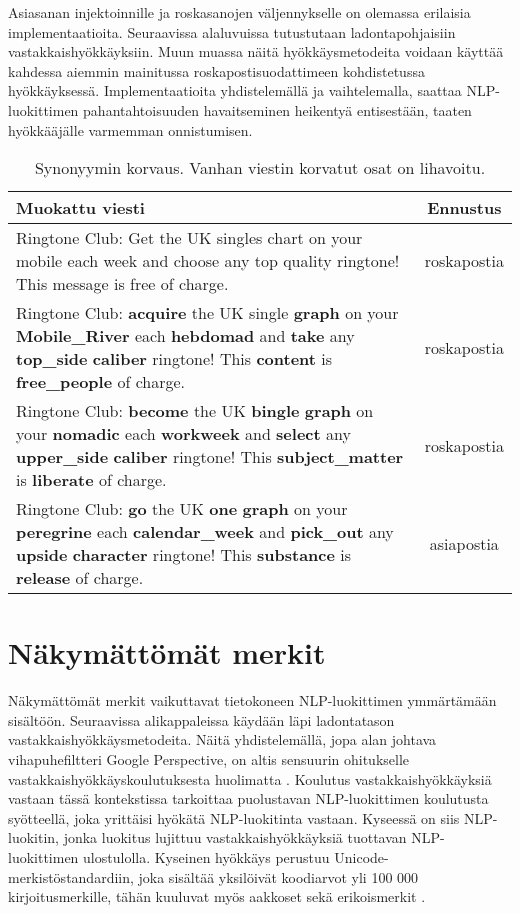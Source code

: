 Asiasanan injektoinnille ja roskasanojen väljennykselle on olemassa erilaisia implementaatioita. Seuraavissa alaluvuissa tutustutaan ladontapohjaisiin vastakkaishyökkäyksiin. Muun muassa näitä hyökkäysmetodeita voidaan käyttää kahdessa aiemmin mainitussa roskapostisuodattimeen kohdistetussa hyökkäyksessä. Implementaatioita yhdistelemällä ja vaihtelemalla, saattaa NLP-luokittimen pahantahtoisuuden havaitseminen heikentyä entisestään, taaten hyökkääjälle varmemman onnistumisen.

\begin{table}[t]
  \begin{tabularx}{\textwidth}{| >{\raggedright\arraybackslash}X | c |}
    \hline
    Muokattu viesti & Ennustus\\
    \hline
    Ringtone Club: Get the UK singles chart on your mobile each week and choose any top quality ringtone! This message is free of charge. & roskapostia\\
    \hline
    Ringtone Club: \textbf{acquire} the UK single \textbf{graph} on your \textbf{Mobile\_River} each \textbf{hebdomad} and \textbf{take} any \textbf{top\_side} \textbf{caliber} ringtone! This \textbf{content} is \textbf{free\_people} of charge. & roskapostia\\
    \hline
    Ringtone Club: \textbf{become} the UK \textbf{bingle} \textbf{graph} on your \textbf{nomadic} each \textbf{workweek} and \textbf{select} any \textbf{upper\_side} \textbf{caliber} ringtone! This \textbf{subject\_matter} is \textbf{liberate} of charge. & roskapostia \\
    \hline
    Ringtone Club: \textbf{go} the UK \textbf{one} \textbf{graph} on your \textbf{peregrine} each \textbf{calendar\_week} and \textbf{pick\_out} any \textbf{upside} \textbf{character} ringtone! This \textbf{substance} is \textbf{release} of charge. & asiapostia \\
    \hline
  \end{tabularx}
  \caption{Synonyymin korvaus. Vanhan viestin korvatut osat on lihavoitu. \citep{spamfilter}}
\end{table}

\section{Näkymättömät merkit}
Näkymättömät merkit vaikuttavat tietokoneen NLP-luokittimen ymmärtämään sisältöön. Seuraavissa alikappaleissa käydään läpi ladontatason vastakkaishyökkäysmetodeita. Näitä yhdistelemällä, jopa alan johtava vihapuhefiltteri Google Perspective, on altis sensuurin ohitukselle vastakkaishyökkäyskoulutuksesta huolimatta \citep{hatespeech}. Koulutus vastakkaishyökkäyksiä vastaan tässä kontekstissa tarkoittaa puolustavan NLP-luokittimen koulutusta syötteellä, joka yrittäisi hyökätä NLP-luokitinta vastaan. Kyseessä on siis NLP-luokitin, jonka luokitus lujittuu vastakkaishyökkäyksiä tuottavan NLP-luokittimen ulostulolla. Kyseinen hyökkäys perustuu Unicode-merkistöstandardiin, joka sisältää yksilöivät koodiarvot yli 100 000 kirjoitusmerkille, tähän kuuluvat myös aakkoset sekä erikoismerkit \citep{boucher2021bad}.

